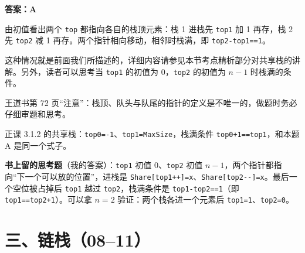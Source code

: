 \documentclass[10.5pt,a4paper,oneside]{article}
\newcommand{\hlred}[1]{\textcolor{wdred}{\bfseries #1}}
\newcommand{\tocback}{\par\vspace{-3pt}{\hfill\footnotesize\hyperlink{toc}{\textcolor{wdgray}{\ensuremath{\uparrow}\,回到目录}}}\par\vspace{-4pt}}
\begin{document}
\hlred{\textbf{答案：A}}

\begin{videobox}

由初值看出两个 \texttt{top} 都指向各自的栈顶元素：栈 1 进栈先
\texttt{top1} 加 1 再存，栈 2 先 \texttt{top2} 减 1
再存。两个指针相向移动，相邻时栈满，即 \texttt{top2-top1==1}。

\end{videobox}

\begin{jiexibox}

这种情况就是前面我们所描述的，详细内容请参见本节考点精析部分对共享栈的讲解。另外，读者可以思考当
\texttt{top1} 的初值为 0，\texttt{top2} 的初值为 \(n-1\) 时栈满的条件。

\end{jiexibox}

\begin{bookbox}

王道书第 72
页“注意”：栈顶、队头与队尾的指针的定义是不唯一的，做题时务必仔细审题和思考。

\end{bookbox}

\begin{recallbox}

正课 3.1.2 的共享栈：\texttt{top0=-1}、\texttt{top1=MaxSize}，栈满条件
\texttt{top0+1==top1}，和本题 A 是同一个式子。

\end{recallbox}

\begin{addbox}

\textbf{书上留的思考题}（我的答案）：\texttt{top1} 初值 0、\texttt{top2}
初值 \(n-1\)，两个指针都指向“下一个可以放的位置”，进栈是
\texttt{Share{[}top1++{]}=x}、\texttt{Share{[}top2-\/-{]}=x}。最后一个空位被占掉后
\texttt{top1} 越过 \texttt{top2}，栈满条件是 \texttt{top1-top2==1}（即
\texttt{top1==top2+1}）。可以拿 \(n=2\) 验证：两个栈各进一个元素后
\texttt{top1=1}、\texttt{top2=0}。

\end{addbox}

\hypertarget{ux4e09ux94feux68080811}{%
\section{三、链栈（08--11）}\label{ux4e09ux94feux68080811}}

\tocback

\vspace{22pt}
\end{document}
